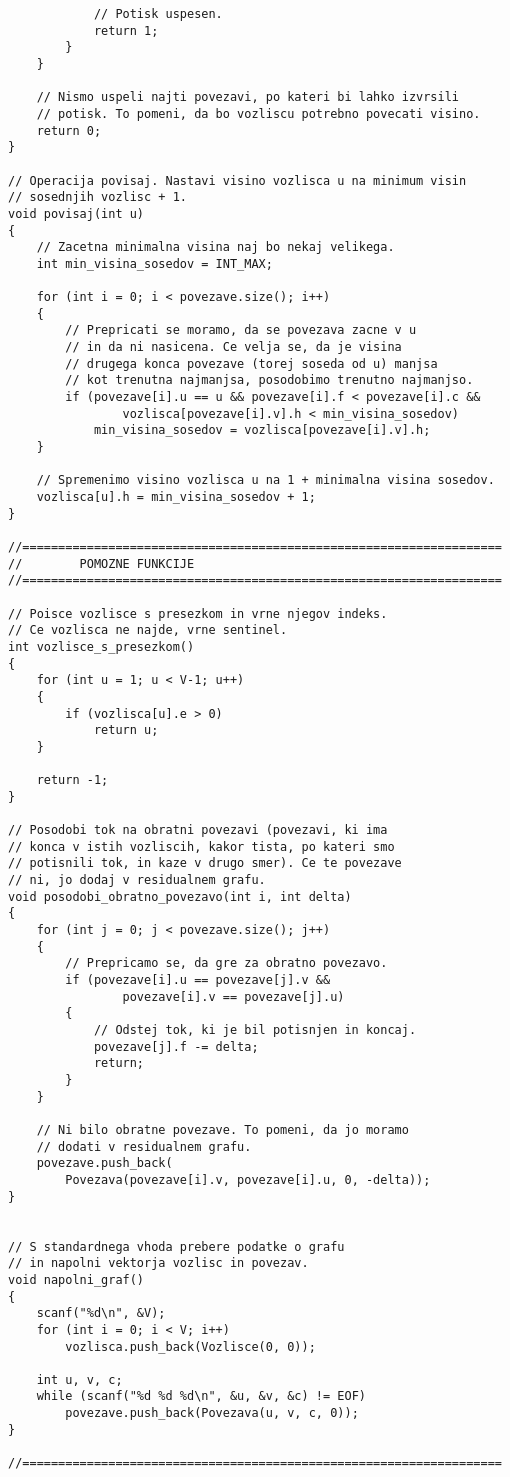 \documentclass[mat1]{fmfdelo}
\begin{document}
\begin{verbatim}
            // Potisk uspesen.
            return 1;
        }
    }
    
    // Nismo uspeli najti povezavi, po kateri bi lahko izvrsili
    // potisk. To pomeni, da bo vozliscu potrebno povecati visino.
    return 0;
}

// Operacija povisaj. Nastavi visino vozlisca u na minimum visin
// sosednjih vozlisc + 1.
void povisaj(int u)
{
    // Zacetna minimalna visina naj bo nekaj velikega.
    int min_visina_sosedov = INT_MAX;
    
    for (int i = 0; i < povezave.size(); i++)
    {
        // Prepricati se moramo, da se povezava zacne v u
        // in da ni nasicena. Ce velja se, da je visina
        // drugega konca povezave (torej soseda od u) manjsa
        // kot trenutna najmanjsa, posodobimo trenutno najmanjso.
        if (povezave[i].u == u && povezave[i].f < povezave[i].c &&
                vozlisca[povezave[i].v].h < min_visina_sosedov)
            min_visina_sosedov = vozlisca[povezave[i].v].h;
    }
    
    // Spremenimo visino vozlisca u na 1 + minimalna visina sosedov.
    vozlisca[u].h = min_visina_sosedov + 1;
}

//===================================================================
//        POMOZNE FUNKCIJE
//===================================================================

// Poisce vozlisce s presezkom in vrne njegov indeks.
// Ce vozlisca ne najde, vrne sentinel.
int vozlisce_s_presezkom()
{
    for (int u = 1; u < V-1; u++)
    {
        if (vozlisca[u].e > 0)
            return u;
    }
    
    return -1;
}

// Posodobi tok na obratni povezavi (povezavi, ki ima
// konca v istih vozliscih, kakor tista, po kateri smo
// potisnili tok, in kaze v drugo smer). Ce te povezave
// ni, jo dodaj v residualnem grafu.
void posodobi_obratno_povezavo(int i, int delta)
{
    for (int j = 0; j < povezave.size(); j++)
    {
        // Prepricamo se, da gre za obratno povezavo.
        if (povezave[i].u == povezave[j].v &&
                povezave[i].v == povezave[j].u)
        {
            // Odstej tok, ki je bil potisnjen in koncaj.
            povezave[j].f -= delta;
            return;
        }
    }
    
    // Ni bilo obratne povezave. To pomeni, da jo moramo
    // dodati v residualnem grafu.
    povezave.push_back(
        Povezava(povezave[i].v, povezave[i].u, 0, -delta));
}


// S standardnega vhoda prebere podatke o grafu
// in napolni vektorja vozlisc in povezav.
void napolni_graf()
{
    scanf("%d\n", &V);
    for (int i = 0; i < V; i++)
        vozlisca.push_back(Vozlisce(0, 0));
    
    int u, v, c;
    while (scanf("%d %d %d\n", &u, &v, &c) != EOF)
        povezave.push_back(Povezava(u, v, c, 0));
}

//===================================================================

\end{verbatim}
\end{document}
